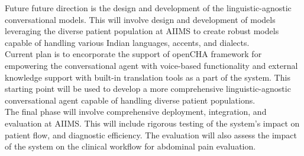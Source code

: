\noindent Future future direction is the design and development of the linguistic-agnostic conversational models. This will involve design and development of models leveraging the diverse patient population at AIIMS to create robust models capable of handling various Indian languages, accents, and dialects. \\[\baselineskip]


\noindent Current plan is to encorporate the support of openCHA framework \cite{abbasian2023conversational} for empowering the conversational agent with voice-based functionality and external knowledge support with built-in translation tools as a part of the system. This starting point will be used to develop a more comprehensive linguistic-agnostic conversational agent capable of handling diverse patient populations.\\[\baselineskip]


\noindent The final phase will involve comprehensive deployment, integration, and evaluation at AIIMS. This will include rigorous testing of the system's impact on patient flow, and diagnostic efficiency. The evaluation will also assess the impact of the system on the clinical workflow for abdominal pain evaluation.